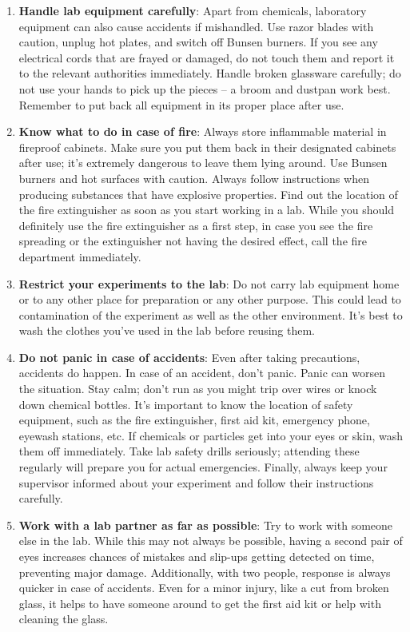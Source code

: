\documentclass[11pt]{article}
\begin{document}
\begin{enumerate}[noitemsep]
  \item \textbf{Handle lab equipment carefully}: Apart from chemicals, laboratory equipment can also cause accidents if mishandled. Use razor blades with caution, unplug hot plates, and switch off Bunsen burners. If you see any electrical cords that are frayed or damaged, do not touch them and report it to the relevant authorities immediately. Handle broken glassware carefully; do not use your hands to pick up the pieces – a broom and dustpan work best. Remember to put back all equipment in its proper place after use.
  \item \textbf{Know what to do in case of fire}: Always store inflammable material in fireproof cabinets. Make sure you put them back in their designated cabinets after use; it’s extremely dangerous to leave them lying around. Use Bunsen burners and hot surfaces with caution. Always follow instructions when producing substances that have explosive properties. Find out the location of the fire extinguisher as soon as you start working in a lab. While you should definitely use the fire extinguisher as a first step, in case you see the fire spreading or the extinguisher not having the desired effect, call the fire department immediately.
  \item \textbf{Restrict your experiments to the lab}: Do not carry lab equipment home or to any other place for preparation or any other purpose. This could lead to contamination of the experiment as well as the other environment. It’s best to wash the clothes you’ve used in the lab before reusing them.
  \item \textbf{Do not panic in case of accidents}: Even after taking precautions, accidents do happen. In case of an accident, don’t panic. Panic can worsen the situation. Stay calm; don’t run as you might trip over wires or knock down chemical bottles. It’s important to know the location of safety equipment, such as the fire extinguisher, first aid kit, emergency phone, eyewash stations, etc. If chemicals or particles get into your eyes or skin, wash them off immediately. Take lab safety drills seriously; attending these regularly will prepare you for actual emergencies. Finally, always keep your supervisor informed about your experiment and follow their instructions carefully.
  \item \textbf{Work with a lab partner as far as possible}: Try to work with someone else in the lab. While this may not always be possible, having a second pair of eyes increases chances of mistakes and slip-ups getting detected on time, preventing major damage. Additionally, with two people, response is always quicker in case of accidents. Even for a minor injury, like a cut from broken glass, it helps to have someone around to get the first aid kit or help with cleaning the glass.

\end{enumerate}
\end{document}
